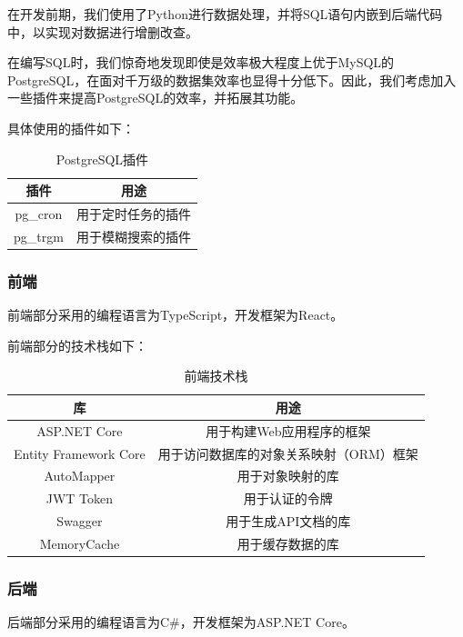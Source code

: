 \documentclass[UTF8,openany]{ctexbook}
\begin{document}
在开发前期，我们使用了Python进行数据处理，并将SQL语句内嵌到后端代码中，以实现对数据进行增删改查。

在编写SQL时，我们惊奇地发现即使是效率极大程度上优于MySQL的PostgreSQL，在面对千万级的数据集效率也显得十分低下。因此，我们考虑加入一些插件来提高PostgreSQL的效率，并拓展其功能。

具体使用的插件如下：

\begin{table}[H]
    \centering
    \begin{tabular}{cc}
    \toprule
    \textbf{插件} &  \textbf{用途} \\ 
    \midrule
    pg\_cron & 用于定时任务的插件 \\
    pg\_trgm & 用于模糊搜索的插件 \\
    \bottomrule
    \end{tabular}
    \caption{PostgreSQL插件}
\end{table}

\subsubsection{前端}

前端部分采用的编程语言为TypeScript，开发框架为React。

前端部分的技术栈如下：

\begin{table}[H]
    \centering
    \begin{tabular}{cc}
    \toprule
    \textbf{库} &  \textbf{用途} \\ 
    \midrule
    ASP.NET Core & 用于构建Web应用程序的框架 \\
    Entity Framework Core & 用于访问数据库的对象关系映射（ORM）框架 \\
    AutoMapper & 用于对象映射的库 \\
    JWT Token & 用于认证的令牌 \\
    Swagger & 用于生成API文档的库 \\
    MemoryCache & 用于缓存数据的库 \\
    \bottomrule
    \end{tabular}
    \caption{前端技术栈}
\end{table}

\subsubsection{后端}

后端部分采用的编程语言为C\#，开发框架为ASP.NET Core。
\end{document}
